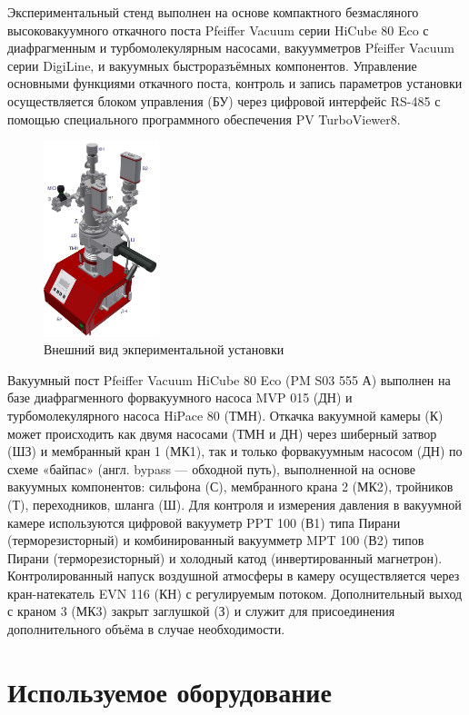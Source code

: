 \documentclass[a4paper, 12pt]{article}
\begin{document}
Экспериментальный стенд выполнен на основе компактного безмасляного высоковакуумного откачного поста Pfeiffer Vacuum серии HiCube 80 Eco с диафрагменным и турбомолекулярным насосами, вакуумметров Pfeiffer Vacuum серии DigiLine, и вакуумных быстроразъёмных компонентов. Управление основными функциями откачного поста, контроль и запись параметров установки осуществляется блоком управления (БУ) через цифровой интерфейс RS-485 с помощью специального программного обеспечения PV TurboViewer8.
\begin{figure}
	\includegraphics[width = 0.3\textwidth]{4.png}
\caption{Внешний вид экпериментальной установки}
\label{ris4}
\end{figure}
Вакуумный пост Pfeiffer Vacuum HiCube 80 Eco (PM S03 555 А) выполнен на базе диафрагменного форвакуумного насоса MVP 015 (ДН) и турбомолекулярного насоса HiPace 80 (ТМН). Откачка вакуумной камеры (К) может происходить как двумя насосами (ТМН и ДН) через шиберный затвор (ШЗ) и мембранный кран 1 (МК1), так и только форвакуумным насосом (ДН) по схеме «байпас» (англ. bypass — обходной путь), выполненной на основе вакуумных компонентов: сильфона (С), мембранного крана 2 (МК2), тройников (Т), переходников, шланга (Ш). Для контроля и измерения давления в вакуумной камере используются цифровой вакууметр PPT 100 (В1) типа Пирани (терморезисторный) и комбинированный вакуумметр MPT 100 (В2) типов Пирани (терморезисторный) и холодный катод (инвертированный магнетрон). Контролированный напуск воздушной атмосферы в камеру осуществляется через кран-натекатель EVN 116 (КН) с регулируемым потоком. Дополнительный выход с краном 3 (МК3) закрыт заглушкой (З) и служит для присоединения дополнительного объёма в случае необходимости.

\section{Используемое оборудование}
\end{document}
